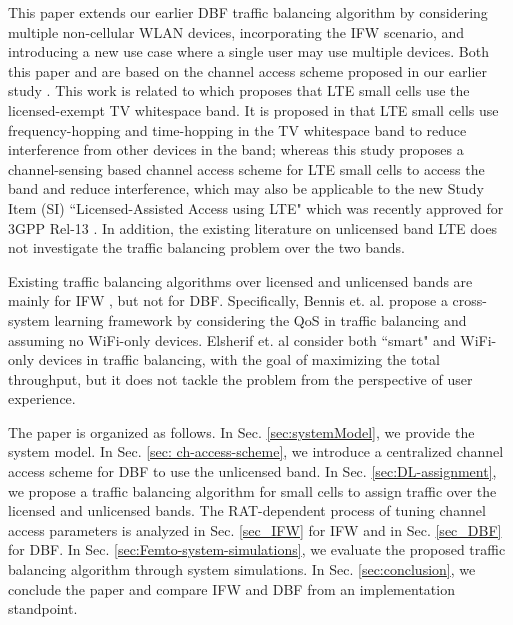 \documentclass[journal,final,letterpaper,10pt,doublecolumn,twoside]{IEEEtran}
\begin{document}
This paper extends our earlier DBF traffic balancing algorithm \cite{feilu_trafficBalancing_conf} by considering multiple non-cellular WLAN devices,  incorporating the IFW scenario, and  introducing a new use case where a single user may use multiple devices. Both this paper and \cite{feilu_trafficBalancing_conf} are based on the channel access scheme proposed in our earlier study \cite{feilu_femto_accessScheme}.
This work is related to \cite{unlicensed-band-LTE} which proposes
that LTE small cells use the licensed-exempt TV whitespace band. It
is proposed in \cite{unlicensed-band-LTE} that LTE small cells use
frequency-hopping and time-hopping in the TV whitespace band to
reduce interference from other devices in the band; whereas this
study proposes a channel-sensing based channel access scheme for LTE
small cells to access the band and reduce interference, which may also be applicable to the new
Study Item (SI) ``Licensed-Assisted Access using LTE"  which was recently approved for 3GPP Rel-13 \cite{3GPP2014LTE-U}. In addition, the existing literature on unlicensed band LTE \cite{unlicensed-band-LTE}\cite{huawei_unlic_LTE}
does not investigate the traffic balancing problem over the two
bands.

Existing traffic balancing algorithms over licensed and unlicensed bands are mainly for IFW \cite{trafficBalance_qos_mag} \cite{fujitsu_trafficBalance_IFW_IncludewifiOnly}, but not for DBF. Specifically, Bennis et. al. \cite{trafficBalance_qos_mag} propose a cross-system learning framework by considering the QoS in traffic balancing and assuming no WiFi-only devices. Elsherif et. al \cite{fujitsu_trafficBalance_IFW_IncludewifiOnly} consider both ``smart" and WiFi-only devices in traffic balancing, with the goal of maximizing the total throughput, but it does not tackle the problem from the perspective of user experience.


The paper is organized as follows.
In Sec. \ref{sec:systemModel}, we provide the system model.
In Sec. \ref{sec: ch-access-scheme}, we introduce a centralized channel access scheme for DBF to use the unlicensed band.
In Sec. \ref{sec:DL-assignment}, we propose a traffic balancing algorithm for small cells to assign traffic over the licensed and unlicensed bands.
The RAT-dependent process of tuning channel access parameters is analyzed in Sec. \ref{sec_IFW} for IFW and in Sec. \ref{sec_DBF} for DBF. In Sec. \ref{sec:Femto-system-simulations}, we
evaluate the proposed traffic balancing algorithm through system simulations. In Sec. \ref{sec:conclusion}, we conclude the paper and compare IFW and DBF from an implementation standpoint.
\end{document}
